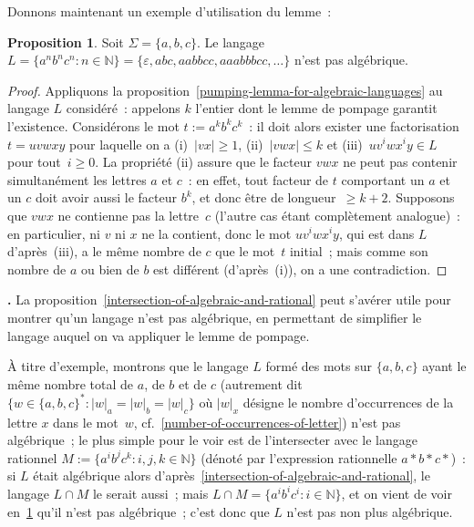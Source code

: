 \documentclass[12pt,a4paper]{article}
\theoremstyle{definition}
\newcommand\thingy{%
\refstepcounter{comcnt}\medskip\noindent\textbf{\thecomcnt.} }
\newtheorem{prop}[comcnt]{Proposition}
\begin{document}
\smallskip

Donnons maintenant un exemple d'utilisation du lemme :

\begin{prop}\label{example-of-pumping-lemma-for-algebraic-languages}
Soit $\Sigma = \{a,b,c\}$.  Le langage $L = \{a^n b^n c^n :
n\in\mathbb{N}\} = \{\varepsilon, abc, aabbcc, aaabbbcc,\ldots\}$
n'est pas algébrique.
\end{prop}
\begin{proof}
Appliquons la proposition \ref{pumping-lemma-for-algebraic-languages}
au langage $L$ considéré : appelons $k$ l'entier dont le lemme de
pompage garantit l'existence.  Considérons le mot $t := a^k b^k c^k$ :
il doit alors exister une factorisation $t = uvwxy$ pour laquelle on a
(i) $|vx|\geq 1$, (ii) $|vwx|\leq k$ et (iii) $uv^iwx^iy \in L$ pour
tout $i\geq 0$.  La propriété (ii) assure que le facteur $vwx$ ne peut
pas contenir simultanément les lettres $a$ et $c$ : en effet, tout
facteur de $t$ comportant un $a$ et un $c$ doit avoir aussi le facteur
$b^k$, et donc être de longueur $\geq k+2$.  Supposons que $vwx$ ne
contienne pas la lettre $c$ (l'autre cas étant complètement
analogue) : en particulier, ni $v$ ni $x$ ne la contient, donc le mot
$uv^iwx^iy$, qui est dans $L$ d'après (iii), a le même nombre de $c$
que le mot $t$ initial ; mais comme son nombre de $a$ ou bien de $b$
est différent (d'après (i)), on a une contradiction.
\end{proof}

\thingy La proposition \ref{intersection-of-algebraic-and-rational}
peut s'avérer utile pour montrer qu'un langage n'est pas algébrique,
en permettant de simplifier le langage auquel on va appliquer le lemme
de pompage.

\smallskip

À titre d'exemple, montrons que le langage $L$ formé des mots sur
$\{a,b,c\}$ ayant le même nombre total de $a$, de $b$ et de $c$
(autrement dit $\{w \in \{a,b,c\}^* : |w|_a = |w|_b = |w|_c\}$ où
$|w|_x$ désigne le nombre d'occurrences de la lettre $x$ dans le
mot $w$, cf. \ref{number-of-occurrences-of-letter}) n'est pas
algébrique ; le plus simple pour le voir est de l'intersecter avec le
langage rationnel $M := \{a^i b^j c^k : i,j,k\in\mathbb{N}\}$ (dénoté
par l'expression rationnelle $a{*}b{*}c{*}$) : si $L$ était algébrique
alors d'après \ref{intersection-of-algebraic-and-rational}, le langage
$L\cap M$ le serait aussi ; mais $L\cap M = \{a^i b^i c^i :
i\in\mathbb{N}\}$, et on vient de voir
en \ref{example-of-pumping-lemma-for-algebraic-languages} qu'il n'est
pas algébrique ; c'est donc que $L$ n'est pas non plus algébrique.
\end{document}
